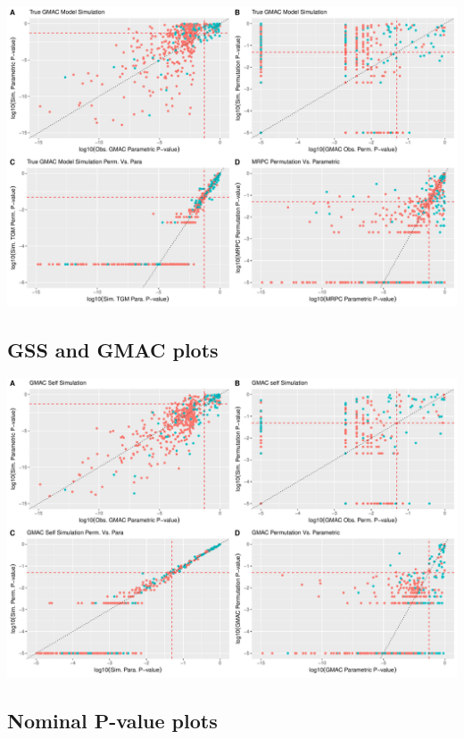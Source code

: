 \documentclass[
]{article}
\begin{document}
\includegraphics{GMACwriteup_files/figure-latex/unnamed-chunk-7-1.pdf}

\hypertarget{gss-and-gmac-plots}{%
\subsection{GSS and GMAC plots}\label{gss-and-gmac-plots}}

\includegraphics{GMACwriteup_files/figure-latex/unnamed-chunk-8-1.pdf}

\hypertarget{nominal-p-value-plots}{%
\subsection{Nominal P-value plots}\label{nominal-p-value-plots}}
\end{document}
